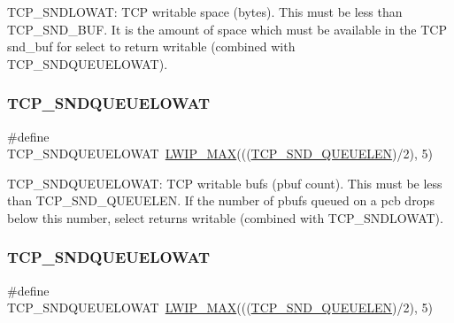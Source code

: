 T\+C\+P\+\_\+\+S\+N\+D\+L\+O\+W\+AT\+: T\+CP writable space (bytes). This must be less than T\+C\+P\+\_\+\+S\+N\+D\+\_\+\+B\+UF. It is the amount of space which must be available in the T\+CP snd\+\_\+buf for select to return writable (combined with T\+C\+P\+\_\+\+S\+N\+D\+Q\+U\+E\+U\+E\+L\+O\+W\+AT). \mbox{\label{group__lwip__opts__tcp_ga75659867592a6b01c198532ed1b65698}} 
\subsubsection{\texorpdfstring{T\+C\+P\+\_\+\+S\+N\+D\+Q\+U\+E\+U\+E\+L\+O\+W\+AT}{TCP\_SNDQUEUELOWAT}\hspace{0.1cm}{\footnotesize\ttfamily [1/2]}}
{\footnotesize\ttfamily \#define T\+C\+P\+\_\+\+S\+N\+D\+Q\+U\+E\+U\+E\+L\+O\+W\+AT~\hyperlink{openmote-cc2538_2lwip_2src_2include_2lwip_2def_8h_a21ea174d374106caeafb4aa3a24fbd2b}{L\+W\+I\+P\+\_\+\+M\+AX}(((\hyperlink{openmote-cc2538_2lwip_2test_2unit_2lwipopts_8h_a9beaa47832ead4180981bfbf71074904}{T\+C\+P\+\_\+\+S\+N\+D\+\_\+\+Q\+U\+E\+U\+E\+L\+EN})/2), 5)}

T\+C\+P\+\_\+\+S\+N\+D\+Q\+U\+E\+U\+E\+L\+O\+W\+AT\+: T\+CP writable bufs (pbuf count). This must be less than T\+C\+P\+\_\+\+S\+N\+D\+\_\+\+Q\+U\+E\+U\+E\+L\+EN. If the number of pbufs queued on a pcb drops below this number, select returns writable (combined with T\+C\+P\+\_\+\+S\+N\+D\+L\+O\+W\+AT). \mbox{\label{group__lwip__opts__tcp_ga75659867592a6b01c198532ed1b65698}} 
\subsubsection{\texorpdfstring{T\+C\+P\+\_\+\+S\+N\+D\+Q\+U\+E\+U\+E\+L\+O\+W\+AT}{TCP\_SNDQUEUELOWAT}\hspace{0.1cm}{\footnotesize\ttfamily [2/2]}}
{\footnotesize\ttfamily \#define T\+C\+P\+\_\+\+S\+N\+D\+Q\+U\+E\+U\+E\+L\+O\+W\+AT~\hyperlink{openmote-cc2538_2lwip_2src_2include_2lwip_2def_8h_a21ea174d374106caeafb4aa3a24fbd2b}{L\+W\+I\+P\+\_\+\+M\+AX}(((\hyperlink{openmote-cc2538_2lwip_2test_2unit_2lwipopts_8h_a9beaa47832ead4180981bfbf71074904}{T\+C\+P\+\_\+\+S\+N\+D\+\_\+\+Q\+U\+E\+U\+E\+L\+EN})/2), 5)}

